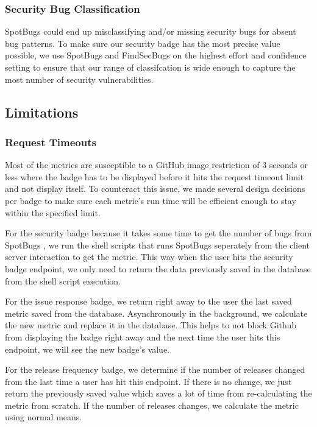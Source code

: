 \documentclass[12pt, letterpaper]{article}
\begin{document}
\subsubsection{Security Bug Classification}
SpotBugs \cite{spotbugs} could end up misclassifying and/or missing security bugs for absent bug patterns.
To make sure our security badge has the most precise value possible, we use SpotBugs \cite{spotbugs}
and FindSecBugs \cite{findsecbugs} on the highest effort and confidence setting to ensure that 
our range of classifcation is wide enough to capture the most number of security vulnerabilities.


\subsection{Limitations}
\subsubsection{Request Timeouts}
Most of the metrics are susceptible to a GitHub \cite{github} image restriction of 3 seconds or less
where the badge has to be displayed before it hits the request timeout limit and not display itself.
To counteract this issue, we made several design decisions per badge to make sure each metric's
run time will be efficient enough to stay within the specified limit.


For the security badge because it takes some time to get the number of bugs from SpotBugs \cite{spotbugs},
we run the shell scripts that runs SpotBugs seperately from the client server interaction to get the metric.
This way when the user hits the security badge endpoint, we only need to return the data previously saved in the 
database from the shell script execution.


For the issue response badge, we return right away to the user the last saved metric saved from the database.
Asynchronously in the background, we calculate the new metric and replace it in the database.
This helps to not block Github from displaying the badge right away and the next time the user hits this endpoint,
we will see the new badge's value.


For the release frequency badge, we determine if the number of releases changed from the last time a user has 
hit this endpoint. If there is no change, we just return the previously saved value which saves a lot of time 
from re-calculating the metric from scratch. If the number of releases changes, we calculate the metric using 
normal means. 
\end{document}
